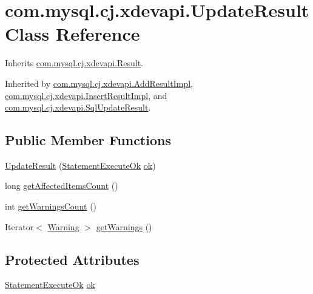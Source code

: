 \hypertarget{classcom_1_1mysql_1_1cj_1_1xdevapi_1_1_update_result}{}\section{com.\+mysql.\+cj.\+xdevapi.\+Update\+Result Class Reference}
\label{classcom_1_1mysql_1_1cj_1_1xdevapi_1_1_update_result}


Inherits \mbox{\hyperlink{interfacecom_1_1mysql_1_1cj_1_1xdevapi_1_1_result}{com.\+mysql.\+cj.\+xdevapi.\+Result}}.



Inherited by \mbox{\hyperlink{classcom_1_1mysql_1_1cj_1_1xdevapi_1_1_add_result_impl}{com.\+mysql.\+cj.\+xdevapi.\+Add\+Result\+Impl}}, \mbox{\hyperlink{classcom_1_1mysql_1_1cj_1_1xdevapi_1_1_insert_result_impl}{com.\+mysql.\+cj.\+xdevapi.\+Insert\+Result\+Impl}}, and \mbox{\hyperlink{classcom_1_1mysql_1_1cj_1_1xdevapi_1_1_sql_update_result}{com.\+mysql.\+cj.\+xdevapi.\+Sql\+Update\+Result}}.

\subsection*{Public Member Functions}
\begin{DoxyCompactItemize}
\item 
\mbox{\hyperlink{classcom_1_1mysql_1_1cj_1_1xdevapi_1_1_update_result_a931d745fc11aee840dd19c930eb4b465}{Update\+Result}} (\mbox{\hyperlink{classcom_1_1mysql_1_1cj_1_1protocol_1_1x_1_1_statement_execute_ok}{Statement\+Execute\+Ok}} \mbox{\hyperlink{classcom_1_1mysql_1_1cj_1_1xdevapi_1_1_update_result_a9314dbffc186019112194b43a86e0174}{ok}})
\item 
long \mbox{\hyperlink{classcom_1_1mysql_1_1cj_1_1xdevapi_1_1_update_result_a0af03ef8678c7e0aba1569e7bda5b979}{get\+Affected\+Items\+Count}} ()
\item 
int \mbox{\hyperlink{classcom_1_1mysql_1_1cj_1_1xdevapi_1_1_update_result_a5a4640f6081699843d69643728e1038b}{get\+Warnings\+Count}} ()
\item 
Iterator$<$ \mbox{\hyperlink{interfacecom_1_1mysql_1_1cj_1_1protocol_1_1_warning}{Warning}} $>$ \mbox{\hyperlink{classcom_1_1mysql_1_1cj_1_1xdevapi_1_1_update_result_a44b96bc6ac3193b0f276a8317d48b5b3}{get\+Warnings}} ()
\end{DoxyCompactItemize}
\subsection*{Protected Attributes}
\begin{DoxyCompactItemize}
\item 
\mbox{\hyperlink{classcom_1_1mysql_1_1cj_1_1protocol_1_1x_1_1_statement_execute_ok}{Statement\+Execute\+Ok}} \mbox{\hyperlink{classcom_1_1mysql_1_1cj_1_1xdevapi_1_1_update_result_a9314dbffc186019112194b43a86e0174}{ok}}
\end{DoxyCompactItemize}


